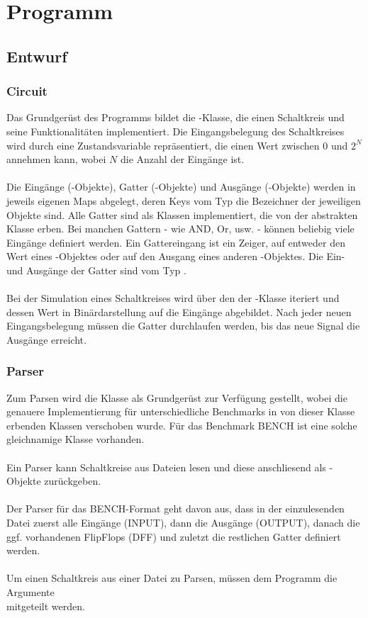 \section{Programm}

\subsection{Entwurf}
\subsubsection{Circuit}
Das Grundgerüst des Programms bildet die -Klasse, die einen Schaltkreis und seine Funktionalitäten implementiert. Die Eingangsbelegung des Schaltkreises wird durch eine Zustandsvariable  repräsentiert, die einen Wert zwischen 0 und $2^N$ annehmen kann, wobei $N$ die Anzahl der Eingänge ist. 
\\\\
Die Eingänge (-Objekte), Gatter (-Objekte) und Ausgänge (-Objekte) werden in jeweils eigenen Maps abgelegt, deren Keys vom Typ  die Bezeichner der jeweiligen Objekte sind. Alle Gatter sind als Klassen implementiert, die von der abstrakten Klasse  erben. Bei manchen Gattern - wie AND, Or, usw. - können beliebig viele Eingänge definiert werden. Ein Gattereingang ist ein Zeiger, auf entweder den Wert eines -Objektes oder auf den Ausgang eines anderen -Objektes. Die Ein- und Ausgänge der Gatter sind vom Typ .
\\\\
Bei der Simulation eines Schaltkreises wird über den  der -Klasse iteriert und dessen Wert in Binärdarstellung auf die Eingänge abgebildet. Nach jeder neuen Eingangsbelegung müssen die Gatter durchlaufen werden, bis das neue Signal die Ausgänge erreicht.

\subsubsection{Parser}
Zum Parsen wird die Klasse  als Grundgerüst zur Verfügung gestellt, wobei die genauere Implementierung für unterschiedliche Benchmarks in von dieser Klasse erbenden Klassen verschoben wurde. Für das Benchmark BENCH ist eine solche gleichnamige Klasse vorhanden. 
\\\\
Ein Parser kann Schaltkreise aus Dateien lesen und diese anschliesend als -Objekte zurückgeben.
\\\\
Der Parser für das BENCH-Format geht davon aus, dass in der einzulesenden Datei zuerst alle Eingänge (INPUT), dann die Ausgänge (OUTPUT), danach die ggf. vorhandenen FlipFlops (DFF) und zuletzt die restlichen Gatter definiert werden. 
\\\\
Um einen Schaltkreis aus einer Datei zu Parsen, müssen dem Programm die Argumente \\ mitgeteilt werden.

